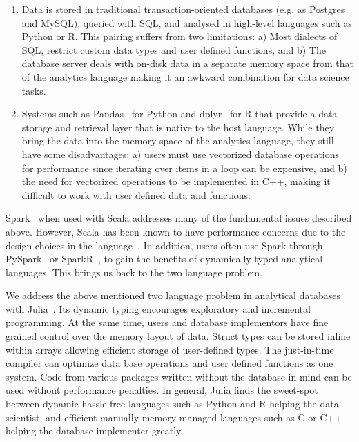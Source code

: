 \documentclass{juliacon}
\begin{document}
\begin{enumerate}
\item Data is stored in traditional transaction-oriented databases (e.g. as Postgres and MySQL), queried with SQL, and analysed in high-level languages such as Python or R. This pairing suffers from two limitations: a) Most dialects of SQL, restrict custom data types and user defined functions, and b) The database server deals with on-disk data in a separate memory space from that of the analytics language making it an awkward combination for data science tasks.

\item Systems such as Pandas~\cite{mckinney-proc-scipy-2010} for Python and dplyr~\cite{dplyr} for R that provide a data storage and retrieval layer that is native to the host language. While they bring
the data into the memory space of the analytics language, they still
have some disadvantages: a) users must use vectorized database operations for performance since iterating over items in a loop can be expensive, and b) the need for vectorized operations to be 
implemented in C++, making it difficult to work with user defined data and functions. 
\end{enumerate}

Spark~\cite{spark} when used with Scala addresses many of the fundamental issues described above. However, Scala has been known to have performance concerns due to the design choices in the language~\cite{scalaslow}. In addition, users often use Spark through PySpark~\cite{pyspark} or SparkR~\cite{sparkr}, to gain the benefits of dynamically typed analytical languages. This brings us back to the two language problem.

We address the above mentioned two language problem in analytical databases with Julia~\cite{bezanson2017julia}. Its dynamic typing encourages exploratory and incremental programming. At the same time, users and database implementors have fine grained control over the memory layout of data. Struct types can be stored inline within arrays allowing efficient storage of user-defined
types. The just-in-time compiler can optimize data base operations and user defined functions as one system. Code from various packages written without the database in mind
can be used without performance penalties. In general, Julia finds the sweet-spot between dynamic
hassle-free languages such as Python and R helping the data scientist,
and efficient manually-memory-managed languages such as C or C++ helping
the database implementer greatly.
\end{document}
